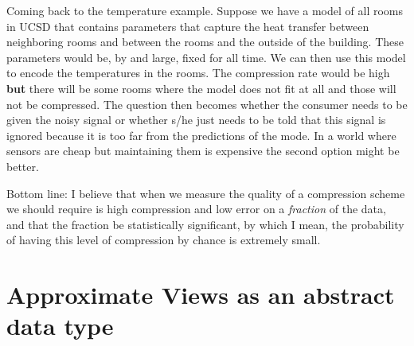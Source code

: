 \documentclass[11pt]{article}
\begin{document}
Coming back to the temperature example. Suppose we have a model of all
rooms in UCSD that contains parameters that capture the heat
transfer between neighboring rooms and between the rooms and the
outside of the building. These parameters would be, by and large,
fixed for all time. We can then use this model to encode the
temperatures in the rooms. The compression rate would be high {\bf
  but} there will be some rooms where the model does not fit at all
and those will not be compressed. The question then becomes whether
the consumer needs to be given the noisy signal or whether s/he just
needs to be told that this signal is ignored because it is too far
from the predictions of the mode. In a world where sensors are cheap
but maintaining them is expensive the second option might be better.

Bottom line: I believe that when we measure the quality of a
compression scheme we should require is high compression and low error
on a {\em fraction} of the data, and that the fraction be
statistically significant, by which I mean, the probability of having
this level of compression by chance is extremely small.


\section{Approximate Views as an abstract data type}
\end{document}
